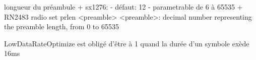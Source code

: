 longueur du préambule
    + sx1276: 
        - défaut: 12
        - parametrable de 6 à 65535
    + RN2483
        radio set prlen <preamble>
        <preamble>: decimal number representing the preamble length, from 0 to 65535


LowDataRateOptimize est obligé d'être à 1 quand la durée d'un symbole exède 16ms